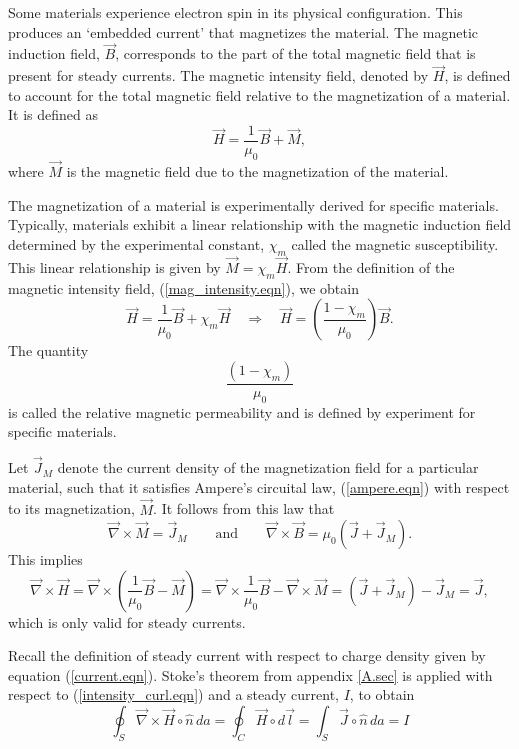 \documentclass[12pt]{article}
\theoremstyle{definition}
\numberwithin{equation}{section}
\begin{document}
Some materials experience electron spin in its physical configuration. This produces an `embedded current' that magnetizes the material. The magnetic induction field, $\vec{B}$, corresponds to the part of the total magnetic field that is present for steady currents. The magnetic intensity field, denoted by $\vec{H}$, is defined to account for the total magnetic field relative to the magnetization of a material. It is defined as
\begin{equation}
\vec{H}=\frac{1}{\mu_0}\vec{B}+\vec{M},
\label{mag_intensity.eqn}
\end{equation}
where $\vec{M}$ is the magnetic field due to the magnetization of the material.

The magnetization of a material is experimentally derived for specific materials. Typically, materials exhibit a linear relationship with the magnetic induction field determined by the experimental constant, $\chi_m$ called the magnetic susceptibility. This linear relationship is given by $\vec{M}=\chi_m\vec{H}$. From the definition of the magnetic intensity field, (\ref{mag_intensity.eqn}), we obtain 
\begin{equation}
\vec{H}=\frac{1}{\mu_0}\vec{B}+\chi_m\vec{H}\quad\Rightarrow\quad\vec{H}=\left(\frac{1-\chi_m}{\mu_0}\right)\vec{B}.
\label{constitutive2.eqn}
\end{equation}
The quantity
$$\frac{(1-\chi_m)}{\mu_0}$$
is called the relative magnetic permeability and is defined by experiment for specific materials.

Let $\vec{J}_M$ denote the current density of the magnetization field for a particular material, such that it satisfies Ampere's circuital law, (\ref{ampere.eqn}) with respect to its magnetization, $\vec{M}$. It follows from this law that
\begin{equation}
\vec{\nabla}\times\vec{M}=\vec{J}_M\qquad\mbox{and}\qquad\vec{\nabla}\times\vec{B}=\mu_0\left(\vec{J}+\vec{J}_M\right).
\nonumber
\end{equation}
This implies
\begin{equation}
\vec{\nabla}\times\vec{H}=\vec{\nabla}\times\left(\frac{1}{\mu_0}\vec{B}-\vec{M}\right)=\vec{\nabla}\times\frac{1}{\mu_0}\vec{B}-\vec{\nabla}\times\vec{M}=\left(\vec{J}+\vec{J}_M\right)-\vec{J}_M=\vec{J},
\label{intensity_curl.eqn}
\end{equation}
which is only valid for steady currents.

Recall the definition of steady current with respect to charge density given by equation (\ref{current.eqn}). Stoke's theorem from appendix \ref{A.sec} is applied with respect to (\ref{intensity_curl.eqn}) and a steady current, $I$, to obtain
\begin{equation}
\oint_S\vec{\nabla}\times\vec{H}\circ\hat{n}\,da=\oint_C\vec{H}\circ d\vec{l}=\int_S\vec{J}\circ\hat{n}\, da=I
\label{steady_current.eqn}
\end{equation}
\end{document}
